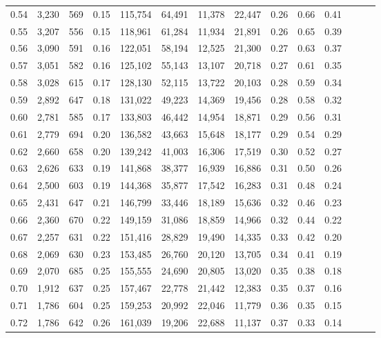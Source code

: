 \begin{tabular}{rrrrrrrrrrrrrr}
0.54 &  3,230 &  569 &  0.15 &  115,754 &   64,491 &  11,378 &  22,447 &  0.26 &  0.66 &      0.41 \\
0.55 &  3,207 &  556 &  0.15 &  118,961 &   61,284 &  11,934 &  21,891 &  0.26 &  0.65 &      0.39 \\
0.56 &  3,090 &  591 &  0.16 &  122,051 &   58,194 &  12,525 &  21,300 &  0.27 &  0.63 &      0.37 \\
0.57 &  3,051 &  582 &  0.16 &  125,102 &   55,143 &  13,107 &  20,718 &  0.27 &  0.61 &      0.35 \\
0.58 &  3,028 &  615 &  0.17 &  128,130 &   52,115 &  13,722 &  20,103 &  0.28 &  0.59 &      0.34 \\
0.59 &  2,892 &  647 &  0.18 &  131,022 &   49,223 &  14,369 &  19,456 &  0.28 &  0.58 &      0.32 \\
0.60 &  2,781 &  585 &  0.17 &  133,803 &   46,442 &  14,954 &  18,871 &  0.29 &  0.56 &      0.31 \\
0.61 &  2,779 &  694 &  0.20 &  136,582 &   43,663 &  15,648 &  18,177 &  0.29 &  0.54 &      0.29 \\
0.62 &  2,660 &  658 &  0.20 &  139,242 &   41,003 &  16,306 &  17,519 &  0.30 &  0.52 &      0.27 \\
0.63 &  2,626 &  633 &  0.19 &  141,868 &   38,377 &  16,939 &  16,886 &  0.31 &  0.50 &      0.26 \\
0.64 &  2,500 &  603 &  0.19 &  144,368 &   35,877 &  17,542 &  16,283 &  0.31 &  0.48 &      0.24 \\
0.65 &  2,431 &  647 &  0.21 &  146,799 &   33,446 &  18,189 &  15,636 &  0.32 &  0.46 &      0.23 \\
0.66 &  2,360 &  670 &  0.22 &  149,159 &   31,086 &  18,859 &  14,966 &  0.32 &  0.44 &      0.22 \\
0.67 &  2,257 &  631 &  0.22 &  151,416 &   28,829 &  19,490 &  14,335 &  0.33 &  0.42 &      0.20 \\
0.68 &  2,069 &  630 &  0.23 &  153,485 &   26,760 &  20,120 &  13,705 &  0.34 &  0.41 &      0.19 \\
0.69 &  2,070 &  685 &  0.25 &  155,555 &   24,690 &  20,805 &  13,020 &  0.35 &  0.38 &      0.18 \\
0.70 &  1,912 &  637 &  0.25 &  157,467 &   22,778 &  21,442 &  12,383 &  0.35 &  0.37 &      0.16 \\
0.71 &  1,786 &  604 &  0.25 &  159,253 &   20,992 &  22,046 &  11,779 &  0.36 &  0.35 &      0.15 \\
0.72 &  1,786 &  642 &  0.26 &  161,039 &   19,206 &  22,688 &  11,137 &  0.37 &  0.33 &      0.14 \\

\end{tabular}
